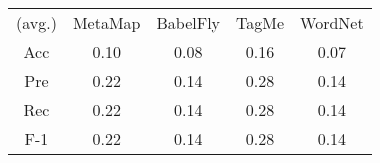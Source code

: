 \begin{tabular}{ccccc}
(avg.) & MetaMap & BabelFly & TagMe & WordNet\\ 
Acc & 0.10 & 0.08 & 0.16 & 0.07\\ 
Pre & 0.22 & 0.14 & 0.28 & 0.14\\ 
Rec & 0.22 & 0.14 & 0.28 & 0.14\\ 
F-1 & 0.22 & 0.14 & 0.28 & 0.14\\ 

\end{tabular}